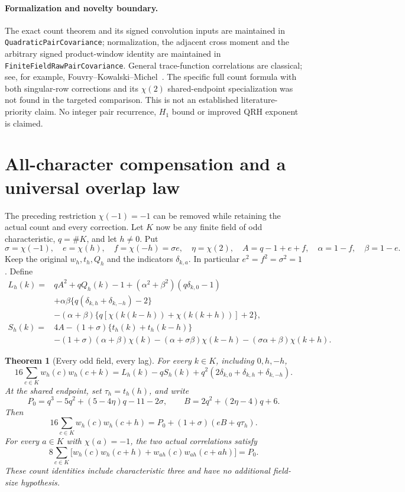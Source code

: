 \documentclass[11pt]{article}
\newtheorem{theorem}{Theorem}[section]
\begin{document}
\paragraph{Formalization and novelty boundary.}
The exact count theorem and its signed convolution inputs are maintained
in \texttt{QuadraticPairCovariance}; normalization, the adjacent cross
moment and the arbitrary signed product-window identity are maintained
in \texttt{FiniteFieldRawPairCovariance}. General trace-function
correlations are classical; see, for example,
Fouvry--Kowalski--Michel~\cite{FouvryKowalskiMichelProducts}.
The specific full count formula with both singular-row corrections and
its \(\chi(2)\) shared-endpoint specialization was not found in the
targeted comparison. This is not an established literature-priority claim.
No integer pair recurrence, \(H_1\) bound or improved QRH exponent is
claimed.

\section{All-character compensation and a universal overlap law}
\label{sec:all-character-compensation}

The preceding restriction \(\chi(-1)=-1\) can be removed while retaining
the actual count and every correction. Let \(K\) now be any finite field
of odd characteristic, \(q=\#K\), and let \(h\ne0\). Put
\[
 \sigma=\chi(-1),\quad e=\chi(h),\quad f=\chi(-h)=\sigma e,\quad
 \eta=\chi(2),\quad
 A=q-1+e+f,\quad \alpha=1-f,\quad\beta=1-e.
\]
Keep the original \(w_h,t_h,Q_h\) and the indicators \(\delta_{k,a}\).
In particular \(e^2=f^2=\sigma^2=1\).
Define
\begin{align*}
 L_h(k)={}&qA^2+qQ_h(k)-1
   +(\alpha^2+\beta^2)(q\delta_{k,0}-1)\\
 &+\alpha\beta\{q(\delta_{k,h}+\delta_{k,-h})-2\}\\
 &-(\alpha+\beta)\{q[\chi(k(k-h))+\chi(k(k+h))]+2\},\\
 S_h(k)={}&4A-(1+\sigma)\{t_h(k)+t_h(k-h)\}\\
 &-(1+\sigma)(\alpha+\beta)\chi(k)
   -(\alpha+\sigma\beta)\chi(k-h)
   -(\sigma\alpha+\beta)\chi(k+h).
\end{align*}

\begin{theorem}[Every odd field, every lag]
For every \(k\in K\), including \(0,h,-h\),
\[
 16\sum_{c\in K}w_h(c)w_h(c+k)
 =L_h(k)-qS_h(k)
   +q^2(2\delta_{k,0}+\delta_{k,h}+\delta_{k,-h}).
\]
At the shared endpoint, set \(\tau_h=t_h(h)\), and write
\[
 P_0=q^3-5q^2+(5-4\eta)q-11-2\sigma,\qquad
 B=2q^2+(2\eta-4)q+6.
\]
Then
\begin{equation}
 16\sum_{c\in K}w_h(c)w_h(c+h)
   =P_0+(1+\sigma)(eB+q\tau_h).
 \label{eq:all-character-adjacent}
\end{equation}
For every \(a\in K\) with \(\chi(a)=-1\), the two actual correlations satisfy
\begin{equation}
 8\sum_{c\in K}\bigl[
    w_h(c)w_h(c+h)+w_{ah}(c)w_{ah}(c+ah)\bigr]=P_0.
 \label{eq:all-character-compensated}
\end{equation}
These count identities include characteristic three and have no
additional field-size hypothesis.
\end{theorem}
\end{document}
